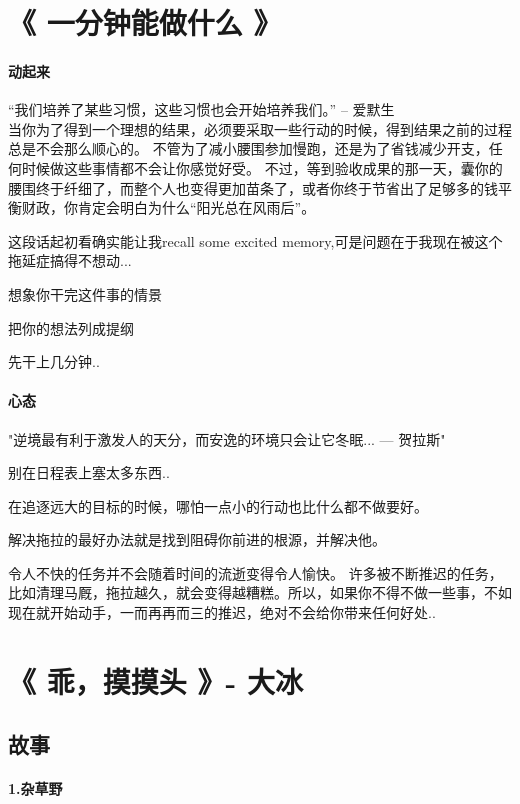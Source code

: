 \documentclass[UTF8,a4paper,8pt]{ctexbook}
\begin{document}
	    \newpage
	 \section{《 一分钟能做什么 》 }    
		\paragraph{动起来}“我们培养了某些习惯，这些习惯也会开始培养我们。” -- 爱默生
		\\
		
				 当你为了得到一个理想的结果，必须要采取一些行动的时候，得到结果之前的过程总是不会那么顺心的。 不管为了减小腰围参加慢跑，还是为了省钱减少开支，任何时候做这些事情都不会让你感觉好受。
			不过，等到验收成果的那一天，囊你的腰围终于纤细了，而整个人也变得更加苗条了，或者你终于节省出了足够多的钱平衡财政，你肯定会明白为什么“阳光总在风雨后”。
			
			这段话起初看确实能让我recall some excited memory,可是问题在于我现在被这个拖延症搞得不想动...
			
			
				 想象你干完这件事的情景
				
				 把你的想法列成提纲
				
				 先干上几分钟..
			 
		\paragraph{心态} "逆境最有利于激发人的天分，而安逸的环境只会让它冬眠... --- 贺拉斯"
		
				别在日程表上塞太多东西..
				
				在追逐远大的目标的时候，哪怕一点小的行动也比什么都不做要好。
				
				解决拖拉的最好办法就是找到阻碍你前进的根源，并解决他。
				
				令人不快的任务并不会随着时间的流逝变得令人愉快。 许多被不断推迟的任务，比如清理马厩，拖拉越久，就会变得越糟糕。所以，如果你不得不做一些事，不如现在就开始动手，一而再再而三的推迟，绝对不会给你带来任何好处..
				
		\newpage			
	 \section{《 乖，摸摸头 》- 大冰 }
		 \subsection{故事}
			 \paragraph{1.杂草野}
\end{document}
